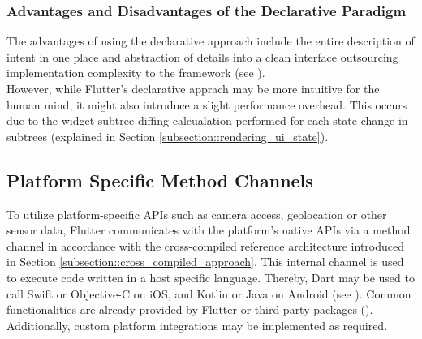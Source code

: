 \subsubsection{Advantages and Disadvantages of the Declarative Paradigm}
The advantages of using the declarative approach include the entire description of intent in one place and abstraction of details into
a clean interface outsourcing implementation complexity to the framework (see \cite{FlutterDeclarative2021}).\\
However, while Flutter's declarative apprach may be more intuitive for the human mind, it might also introduce a slight performance overhead.
This occurs due to the widget subtree diffing calcualation performed for each state change in  subtrees (explained in Section \ref{subsection::rendering_ui_state}).\\

\subsection{Platform Specific Method Channels} \label{subsection::method_channels}
To utilize platform-specific APIs such as camera access, geolocation or other sensor data, Flutter communicates with the platform's native APIs via 
a method channel in accordance with the cross-compiled reference architecture introduced in Section \ref{subsection::cross_compiled_approach}. 
This internal channel is used to execute code written in a host specific language. Thereby, Dart may be used to call Swift or Objective-C on iOS, and Kotlin or Java on Android (see \cite{PlatformChannel2021}).
Common functionalities are already provided by Flutter or third party packages (\cite{PubDev2021}). Additionally, custom platform integrations may be 
implemented as required.

